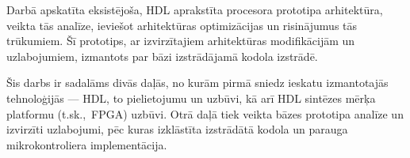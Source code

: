 Darbā apskatīta eksistējoša, HDL aprakstīta procesora prototipa arhitektūra,
veikta tās analīze, ieviešot arhitektūras optimizācijas un risinājumus tās
trūkumiem. Šī prototips, ar izvirzītajiem arhitektūras modifikācijām un 
uzlabojumiem, izmantots par bāzi izstrādājamā kodola izstrādē.


Šis darbs ir sadalāms divās daļās, no kurām pirmā sniedz ieskatu
izmantotajās tehnoloģijās --- HDL, to pielietojumu un uzbūvi, kā arī HDL
sintēzes mērķa platformu (t.sk.,~FPGA) uzbūvi. Otrā daļā tiek veikta bāzes
prototipa analīze un izvirzīti uzlabojumi, pēc kuras izklāstīta izstrādātā
kodola un parauga mikrokontroliera implementācija.

